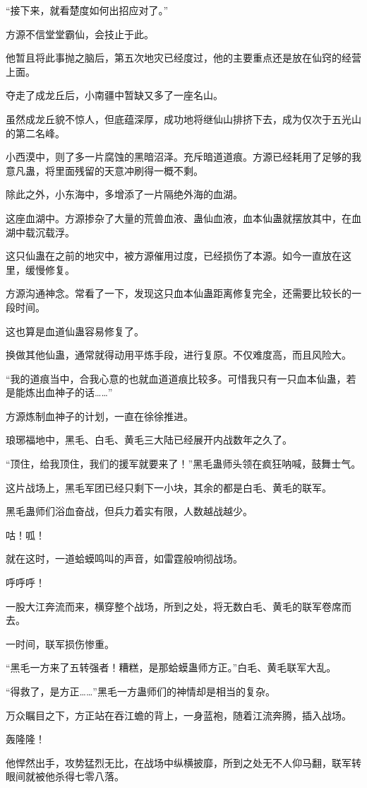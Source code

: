 \begin{this_body}
“接下来，就看楚度如何出招应对了。”

方源不信堂堂霸仙，会技止于此。

他暂且将此事抛之脑后，第五次地灾已经度过，他的主要重点还是放在仙窍的经营上面。

夺走了成龙丘后，小南疆中暂缺又多了一座名山。

虽然成龙丘貌不惊人，但底蕴深厚，成功地将继仙山排挤下去，成为仅次于五光山的第二名峰。

小西漠中，则了多一片腐蚀的黑暗沼泽。充斥暗道道痕。方源已经耗用了足够的我意凡蛊，将里面残留的天意冲刷得一概不剩。

除此之外，小东海中，多增添了一片隔绝外海的血湖。

这座血湖中。方源掺杂了大量的荒兽血液、蛊仙血液，血本仙蛊就摆放其中，在血湖中载沉载浮。

这只仙蛊在之前的地灾中，被方源催用过度，已经损伤了本源。如今一直放在这里，缓慢修复。

方源沟通神念。常看了一下，发现这只血本仙蛊距离修复完全，还需要比较长的一段时间。

这也算是血道仙蛊容易修复了。

换做其他仙蛊，通常就得动用平炼手段，进行复原。不仅难度高，而且风险大。

“我的道痕当中，合我心意的也就血道道痕比较多。可惜我只有一只血本仙蛊，若是能炼出血神子的话……”

方源炼制血神子的计划，一直在徐徐推进。

琅琊福地中，黑毛、白毛、黄毛三大陆已经展开内战数年之久了。

“顶住，给我顶住，我们的援军就要来了！”黑毛蛊师头领在疯狂呐喊，鼓舞士气。

这片战场上，黑毛军团已经只剩下一小块，其余的都是白毛、黄毛的联军。

黑毛蛊师们浴血奋战，但兵力着实有限，人数越战越少。

咕！呱！

就在这时，一道蛤蟆鸣叫的声音，如雷霆般响彻战场。

呼呼呼！

一股大江奔流而来，横穿整个战场，所到之处，将无数白毛、黄毛的联军卷席而去。

一时间，联军损伤惨重。

“黑毛一方来了五转强者！糟糕，是那蛤蟆蛊师方正。”白毛、黄毛联军大乱。

“得救了，是方正……”黑毛一方蛊师们的神情却是相当的复杂。

万众瞩目之下，方正站在吞江蟾的背上，一身蓝袍，随着江流奔腾，插入战场。

轰隆隆！

他悍然出手，攻势猛烈无比，在战场中纵横披靡，所到之处无不人仰马翻，联军转眼间就被他杀得七零八落。

\end{this_body}

